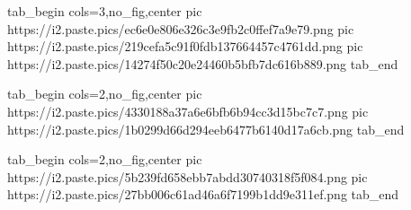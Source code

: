  
 
 
 
 
\qqSecCmtScr

\ifcmt
  tab_begin cols=3,no_fig,center
     pic https://i2.paste.pics/ec6e0e806e326c3e9fb2c0ffef7a9e79.png
		 pic https://i2.paste.pics/219cefa5c91f0fdb137664457c4761dd.png
		 pic https://i2.paste.pics/14274f50c20e24460b5bfb7dc616b889.png
  tab_end
\fi

\ifcmt
  tab_begin cols=2,no_fig,center
		pic https://i2.paste.pics/4330188a37a6e6bfb6b94cc3d15bc7c7.png
		pic https://i2.paste.pics/1b0299d66d294eeb6477b6140d17a6cb.png
  tab_end
\fi

\ifcmt
  tab_begin cols=2,no_fig,center
		pic https://i2.paste.pics/5b239fd658ebb7abdd30740318f5f084.png
		pic https://i2.paste.pics/27bb006c61ad46a6f7199b1dd9e311ef.png
  tab_end
\fi
